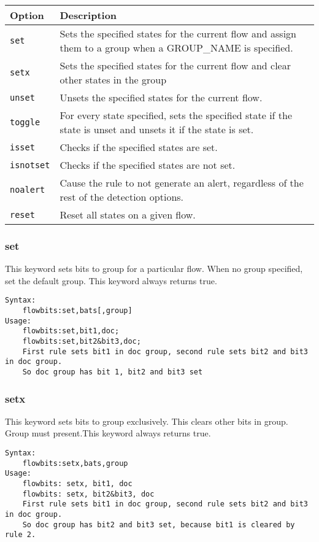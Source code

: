 \documentclass[english]{report}
\begin{document}
\begin{tabular}{| l | p{4.5in} |}
\hline
{\bf Option} & {\bf Description}\\
\hline
\hline
\texttt{set} & Sets the specified states for the current flow and assign them to a group when a GROUP\_NAME is specified.\\
\hline
\texttt{setx} & Sets the specified states for the current flow and clear other states in the group\\
\hline
\texttt{unset} & Unsets the specified states for the current flow.\\
\hline
\texttt{toggle} & For every state specified, sets the specified state if the state is unset and unsets it if the state is set.\\
\hline
\texttt{isset} & Checks if the specified states are set.\\
\hline
\texttt{isnotset} & Checks if the specified states are not set.\\
\hline
\texttt{noalert} & Cause the rule to not generate an alert, regardless of the rest of the detection options.\\
\hline
\texttt{reset} & Reset all states on a given flow.\\
\hline
\end{tabular}

\subsubsection{set}
This keyword sets bits to group for a particular flow. When no group specified, set the default group. This keyword always returns true.

\begin{verbatim}
Syntax:
    flowbits:set,bats[,group]
Usage:  
    flowbits:set,bit1,doc;
    flowbits:set,bit2&bit3,doc;
    First rule sets bit1 in doc group, second rule sets bit2 and bit3 in doc group. 
    So doc group has bit 1, bit2 and bit3 set  
\end{verbatim}

\subsubsection{setx}
This keyword sets bits to group exclusively. This clears other bits in group. 
Group must present.This keyword always returns true.
\begin{verbatim}
Syntax:
    flowbits:setx,bats,group
Usage:  
    flowbits: setx, bit1, doc
    flowbits: setx, bit2&bit3, doc
    First rule sets bit1 in doc group, second rule sets bit2 and bit3 in doc group.
    So doc group has bit2 and bit3 set, because bit1 is cleared by rule 2.
 \end{verbatim}
  
\end{document}
